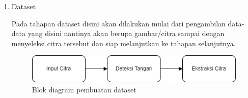 \begin{enumerate}
  \item Dataset \par
  Pada tahapan dataset disini akan dilakukan mulai dari pengambilan data-data yang disini nantinya akan berupa gambar/citra sampai dengan menyeleksi citra tersebut dan siap melanjutkan ke tahapan selanjutnya.

\begin{figure}[!h]
	\centering
	\includegraphics[width=0.7\linewidth]{gambar/Dataset.png}
	\caption{Blok diagram pembuatan dataset}
	\label{fig:gambar32}
\end{figure}


\end{enumerate}

